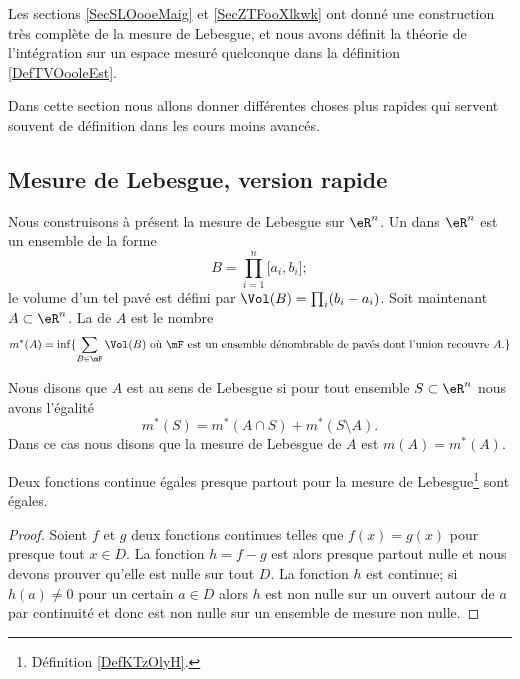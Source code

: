 Les sections \ref{SecSLOooeMaig} et \ref{SecZTFooXlkwk} ont donné une construction très complète de la mesure de Lebesgue, et nous avons définit la théorie de l'intégration sur un espace mesuré quelconque dans la définition \ref{DefTVOooleEst}.

Dans cette section nous allons donner différentes choses plus rapides qui servent souvent de définition dans les cours moins avancés.

\subsection{Mesure de Lebesgue, version rapide}

Nous construisons à présent la mesure de Lebesgue sur \( \eR^n\). Un  dans \( \eR^n\) est un ensemble de la forme 
\begin{equation}
    B=\prod_{i=1}^n\mathopen[ a_i , b_i \mathclose];
\end{equation}
le volume d'un tel pavé est défini par \( \Vol(B)=\prod_i(b_i-a_i)\). Soit maintenant \( A\subset \eR^n\). La  de \( A\) est le nombre
\begin{equation}
    m^*(A)=\inf\{ \sum_{B\in\mF}\Vol(B)\text{ où \( \mF\) est un ensemble dénombrable de pavés dont l'union recouvre \( A\).} \}
\end{equation}

\begin{definition}  \label{DefKTzOlyH}
Nous disons que \( A\) est  au sens de Lebesgue si pour tout ensemble \( S\subset \eR^n\) nous avons l'égalité
\begin{equation}
    m^*(S)=m^*(A\cap S)+m^*(S\setminus A).
\end{equation}
Dans ce cas nous disons que la mesure de Lebesgue de \( A\) est \( m(A)=m^*(A)\).
\end{definition}

\begin{proposition}     \label{PropNCMToWI}
    Deux fonctions continue égales presque partout pour la mesure de Lebesgue\footnote{Définition \ref{DefKTzOlyH}.} sont égales.
\end{proposition}

\begin{proof}
    Soient \( f\) et \( g\) deux fonctions continues telles que \( f(x)=g(x)\) pour presque tout \( x\in D\). La fonction \( h=f-g\) est alors presque partout nulle et nous devons prouver qu'elle est nulle sur tout \( D\). La fonction \( h\) est continue; si \( h(a)\neq 0\) pour un certain \( a\in D\) alors \( h\) est non nulle sur un ouvert autour de \( a\) par continuité et donc est non nulle sur un ensemble de mesure non nulle.
\end{proof}

